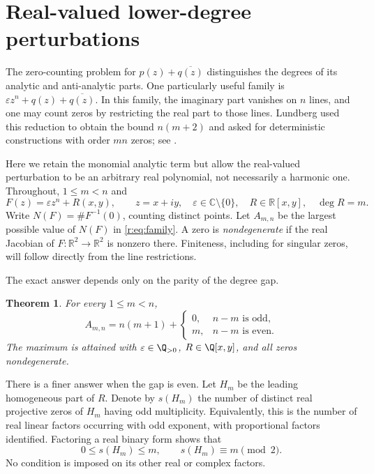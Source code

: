 \documentclass[UTF8,11pt]{ctexart}
\newtheorem{thm}{Theorem}[section]
\theoremstyle{definition}
\numberwithin{equation}{section}
\newcommand{\C}{\mathbb C}\newcommand{\R}{\mathbb R}
\newcommand{\eps}{\varepsilon}\newcommand{\ep}{\varepsilon}
\begin{document}
\section{Real-valued lower-degree perturbations}\label{r:sec:real}

The zero-counting problem for $p(z)+\overline{q(z)}$ distinguishes the
degrees of its analytic and anti-analytic parts. One particularly useful
family is $\eps z^n+q(z)+\overline{q(z)}$. In this family, the imaginary
part vanishes on $n$ lines, and one may count zeros by restricting the
real part to those lines. Lundberg used this reduction to obtain the
bound $n(m+2)$ and asked for deterministic constructions with order
$mn$ zeros; see \cite[Sections~4.1--4.2, author version, pp.~8--9]{Lun23}.

Here we retain the monomial analytic term but allow the real-valued
perturbation to be an arbitrary real polynomial, not necessarily a
harmonic one. Throughout, $1\le m<n$ and
\begin{equation}\label{r:eq:family}
 F(z)=\eps z^n+R(x,y),\qquad z=x+iy,\quad
 \eps\in\C\setminus\{0\},\quad R\in\R[x,y],\quad\deg R=m.
\end{equation}
Write $N(F)=\#F^{-1}(0)$, counting distinct points. Let $A_{m,n}$ be the
largest possible value of $N(F)$ in \eqref{r:eq:family}. A zero is
\emph{nondegenerate} if the real Jacobian of $F:\R^2\to\R^2$ is nonzero
there. Finiteness, including for singular zeros, will follow directly
from the line restrictions.

The exact answer depends only on the parity of the degree gap.
\begin{thm}\label{r:thm:main}
For every $1\le m<n$,
\begin{equation}\label{r:eq:maximum}
 A_{m,n}=n(m+1)+
 \begin{cases}
 0,&n-m\text{ is odd},\\
 m,&n-m\text{ is even}.
 \end{cases}
\end{equation}
The maximum is attained with $\eps\in\Q_{>0}$, $R\in\Q[x,y]$, and all
zeros nondegenerate.
\end{thm}

There is a finer answer when the gap is even. Let $H_m$ be the leading
homogeneous part of $R$. Denote by $s(H_m)$ the number of distinct real
projective zeros of $H_m$ having odd multiplicity. Equivalently, this is
the number of real linear factors occurring with odd exponent, with
proportional factors identified. Factoring a real binary form shows that
\[
 0\le s(H_m)\le m,\qquad s(H_m)\equiv m\pmod2.
\]
No condition is imposed on its other real or complex factors.
\end{document}
